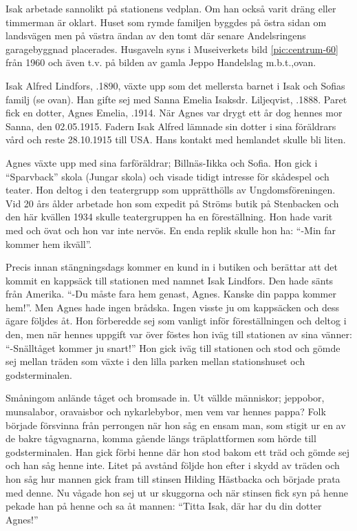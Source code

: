 Isak arbetade sannolikt på stationens vedplan. Om han också varit dräng eller timmerman är oklart. Huset som rymde familjen byggdes på östra sidan om landsvägen men på västra ändan av den tomt där senare Andelsringens garagebyggnad placerades. Husgaveln syns i Museiverkets bild \ref{pic:centrum-60} från 1960 och även t.v. på bilden av gamla Jeppo Handelslag m.b.t.,ovan.
\begin{jhchildren}
  \item {}
  \item {}
  \item {}
\end{jhchildren}

Isak Alfred Lindfors, .1890,  växte upp som det mellersta barnet i Isak och Sofias familj (se ovan). Han gifte sej med Sanna Emelia Isaksdr. Liljeqvist, .1888. Paret fick en dotter, Agnes Emelia, .1914. När Agnes var drygt ett år dog hennes mor Sanna, den 02.05.1915. Fadern Isak Alfred lämnade sin dotter i sina föräldrars vård och reste 28.10.1915 till USA. Hans kontakt med hemlandet skulle bli liten.

Agnes växte upp med sina farföräldrar; Billnäs-Iikka och Sofia. Hon gick i ``Sparvback'' skola (Jungar skola) och visade tidigt intresse för skådespel och teater. Hon deltog i den teatergrupp som upprätthölls av Ungdomsföreningen. Vid 20 års ålder arbetade hon som expedit på Ströms butik på Stenbacken och den här kvällen 1934 skulle teatergruppen ha en föreställning. Hon hade varit med och övat och hon var inte nervös. En enda replik skulle hon ha: ``-Min far kommer hem ikväll''.

Precis innan stängningsdags kommer en kund in i butiken och berättar att det kommit en kappsäck till stationen med namnet Isak Lindfors. Den hade sänts från Amerika. ``-Du måste fara hem genast, Agnes. Kanske din pappa kommer hem!''.  Men Agnes hade ingen brådska. Ingen visste ju om kappsäcken och dess ägare följdes åt. Hon förberedde sej som vanligt inför föreställningen och deltog i den, men när hennes uppgift var över föstes hon iväg till stationen av sina vänner: ``-Snälltåget kommer ju snart!'' Hon gick iväg till stationen och stod och gömde sej mellan träden som växte i den lilla parken mellan stationshuset och godsterminalen.

Småningom anlände tåget och bromsade in. Ut vällde människor; jeppobor, munsalabor, oravaisbor och nykarlebybor, men vem var hennes pappa? Folk började försvinna från perrongen när hon såg en ensam man, som stigit ur en av de bakre tågvagnarna, komma gående längs träplattformen som hörde till godsterminalen. Han gick förbi henne där hon stod bakom ett träd och gömde sej och han såg henne inte. Litet på avstånd följde hon efter i skydd av träden och hon såg hur mannen gick fram till stinsen Hilding Hästbacka och började prata med denne. Nu vågade hon sej ut ur skuggorna och när stinsen fick syn på henne pekade han på henne och sa åt mannen: ``Titta Isak, där har du din dotter Agnes!''

